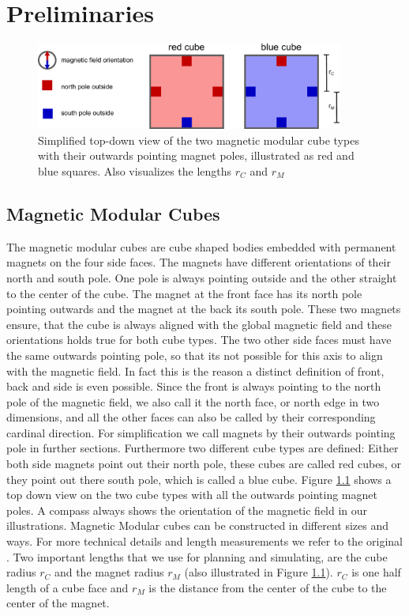 \chapter{Preliminaries}

\begin{figure}
	\centering
	\includegraphics[width=0.90\textwidth]{figures/magnetic_cubes.pdf}
	\caption{Simplified top-down view of the two magnetic modular cube types with their outwards pointing magnet poles, illustrated as red and blue squares. Also visualizes the lengths $r_C$ and $r_M$}
	\label{fig:magnetic_cubes}
\end{figure}

\section{Magnetic Modular Cubes}
The magnetic modular cubes are cube shaped bodies embedded with permanent magnets on the four side faces.
The magnets have different orientations of their north and south pole. 
One pole is always pointing outside and the other straight to the center of the cube.
The magnet at the front face has its north pole pointing outwards and the magnet at the back its south pole.
These two magnets ensure, that the cube is always aligned with the global magnetic field and these orientations holds true for both cube types.
The two other side faces must have the same outwards pointing pole, so that its not possible for this axis to align with the magnetic field.
In fact this is the reason a distinct definition of front, back and side is even possible.
Since the front is always pointing to the north pole of the magnetic field, we also call it the north face, or north edge in two dimensions, and all the other faces can also be called by their corresponding cardinal direction.
For simplification we call magnets by their outwards pointing pole in further sections.
Furthermore two different cube types are defined:
Either both side magnets point out their north pole, these cubes are called red cubes, or they point out there south pole, which is called a blue cube.
Figure \ref{fig:magnetic_cubes} shows a top down view on the two cube types with all the outwards pointing magnet poles.
A compass always shows the orientation of the magnetic field in our illustrations.
Magnetic Modular cubes can be constructed in different sizes and ways. For more technical details and length measurements we refer to the original \cite{Bhattacharjee2022}.
Two important lengths that we use for planning and simulating, are the cube radius $r_C$ and the magnet radius $r_M$ (also illustrated in Figure \ref{fig:magnetic_cubes}).
$r_C$ is one half length of a cube face and $r_M$ is the distance from the center of the cube to the center of the magnet.

